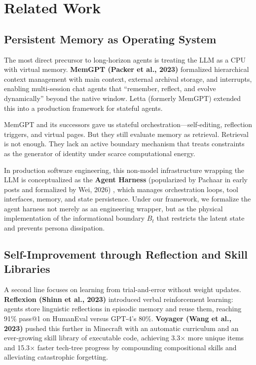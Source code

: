 \documentclass[10pt,journal,compsoc]{IEEEtran}
\begin{document}
\section{Related Work}

\subsection{Persistent Memory as Operating System}
The most direct precursor to long-horizon agents is treating the LLM as a CPU with virtual memory. \textbf{MemGPT (Packer et al., 2023)} \cite{packer2023} formalized hierarchical context management with main context, external archival storage, and interrupts, enabling multi-session chat agents that ``remember, reflect, and evolve dynamically'' beyond the native window. Letta (formerly MemGPT) extended this into a production framework for stateful agents.

MemGPT and its successors gave us stateful orchestration---self-editing, reflection triggers, and virtual pages. But they still evaluate memory as retrieval. Retrieval is not enough. They lack an active boundary mechanism that treats constraints as the generator of identity under scarce computational energy.

In production software engineering, this non-model infrastructure wrapping the LLM is conceptualized as the \textbf{Agent Harness} (popularized by Pachaar in early posts and formalized by Wei, 2026) \cite{wei2026harness}, which manages orchestration loops, tool interfaces, memory, and state persistence. Under our framework, we formalize the agent harness not merely as an engineering wrapper, but as the physical implementation of the informational boundary $B_t$ that restricts the latent state and prevents persona dissipation.

\subsection{Self-Improvement through Reflection and Skill Libraries}
A second line focuses on learning from trial-and-error without weight updates. \textbf{Reflexion (Shinn et al., 2023)} \cite{shinn2023} introduced verbal reinforcement learning: agents store linguistic reflections in episodic memory and reuse them, reaching 91\% pass@1 on HumanEval versus GPT-4's 80\%. \textbf{Voyager (Wang et al., 2023)} \cite{wang2023} pushed this further in Minecraft with an automatic curriculum and an ever-growing skill library of executable code, achieving 3.3$\times$ more unique items and 15.3$\times$ faster tech-tree progress by compounding compositional skills and alleviating catastrophic forgetting.
\end{document}

